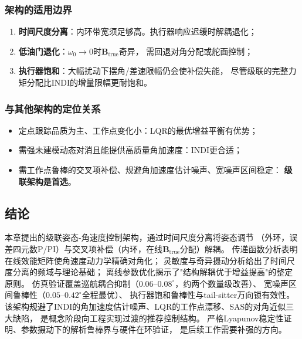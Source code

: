 \subsubsection{架构的适用边界}

\begin{enumerate}[label=(\arabic*)]
    \item \textbf{时间尺度分离}：内环带宽须足够高。执行器响应迟缓时解耦退化；
    \item \textbf{低油门退化}：$\omega_0\to0$时$\mathbf{B}_{\mathrm{true}}$奇异，
          需回退对角分配或舵面控制；
    \item \textbf{执行器饱和}：大幅扰动下摆角/差速限幅仍会使补偿失能，
          尽管级联的完整力矩分配比INDI的增量限幅更耐饱和。
\end{enumerate}

\subsubsection{与其他架构的定位关系}

\begin{itemize}
    \item 定点跟踪品质为主、工作点变化小：LQR的最优增益平衡有优势；
    \item 需强未建模动态对消且能提供高质量角加速度：INDI更合适；
    \item 需工作点鲁棒的交叉项补偿、规避角加速度估计噪声、宽噪声区间稳定：
          \textbf{级联架构是首选}。
\end{itemize}

\subsection{结论}
\label{sec:cascade_conclusion}

本章提出的级联姿态-角速度控制架构，通过时间尺度分离将姿态调节
（外环，误差四元数P/PI）与交叉项补偿（内环，在线$\mathbf{B}_{\mathrm{true}}$分配）解耦。
传递函数分析表明在线效能矩阵使角速度动力学精确对角化；
灵敏度与奇异摄动分析给出了时间尺度分离的频域与理论基础；
离线参数优化揭示了"结构解耦优于增益提高"的整定原则。
仿真验证覆盖巡航耦合抑制（$0.06$--$0.08^\circ$，约两个数量级改善）、
宽噪声区间鲁棒性（$0.05$--$0.42^\circ$全程最优）、
执行器饱和鲁棒性与tail-sitter万向锁有效性。
该架构规避了INDI的角加速度估计噪声、LQR的工作点漂移、SAS的对角近似三大缺陷，
是概念阶段向工程实现过渡的推荐控制结构。
严格Lyapunov稳定性证明、参数摄动下的解析鲁棒界与硬件在环验证，
是后续工作需要补强的方向。
